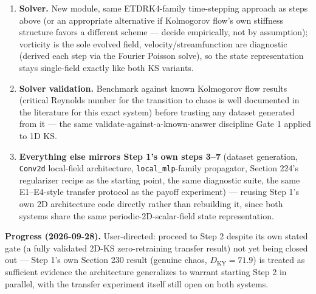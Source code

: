 \documentclass[11pt]{article}
\begin{document}
\begin{enumerate}[nosep]
\item \textbf{Solver.} New module, same ETDRK4-family time-stepping
  approach as steps above (or an appropriate alternative if Kolmogorov
  flow's own stiffness structure favors a different scheme --- decide
  empirically, not by assumption); vorticity is the sole evolved field,
  velocity/streamfunction are diagnostic (derived each step via the
  Fourier Poisson solve), so the state representation stays single-field
  exactly like both KS variants.
\item \textbf{Solver validation.} Benchmark against known Kolmogorov
  flow results (critical Reynolds number for the transition to chaos is
  well documented in the literature for this exact system) before
  trusting any dataset generated from it --- the same
  validate-against-a-known-answer discipline Gate 1 applied to 1D KS.
\item \textbf{Everything else mirrors Step 1's own steps 3--7}
  (dataset generation, \texttt{Conv2d} local-field architecture,
  \texttt{local\_mlp}-family propagator, Section 224's regularizer
  recipe as the starting point, the same diagnostic suite, the same
  E1--E4-style transfer protocol as the payoff experiment) --- reusing
  Step 1's own 2D architecture code directly rather than rebuilding it,
  since both systems share the same periodic-2D-scalar-field state
  representation.
\end{enumerate}

\textbf{Progress (2026-09-28).} User-directed: proceed to Step 2 despite
its own stated gate (a fully validated 2D-KS zero-retraining transfer
result) not yet being closed out --- Step 1's own Section 230 result
(genuine chaos, $D_{\mathrm{KY}}=71.9$) is treated as sufficient evidence
the architecture generalizes to warrant starting Step 2 in parallel,
with the transfer experiment itself still open on both systems.
\end{document}
